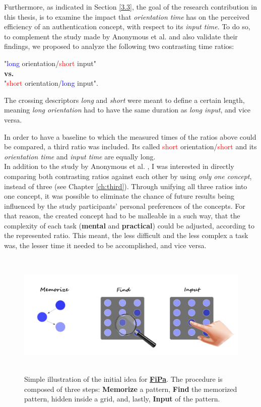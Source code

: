 Furthermore, as indicated in Section \ref{3.3}, the goal of the research contribution in this thesis, is to examine the impact that \textit{orientation time} has on the perceived efficiency of an authentication concept, with respect to its \textit{input time}. To do so, to complement the study made by Anonymous et al. and also validate their findings, we proposed to analyze the following two contrasting time ratios:  
\begin{center}
    "\textcolor{blue}{long} orientation/\textcolor{red}{short} input" \\
    \textbf{vs.} \\
    "\textcolor{red}{short} orientation/\textcolor{blue}{long} input".
\end{center} 

The crossing descriptors \textit{long} and \textit{short} were meant to define a certain length, meaning \textit{long orientation} had to have the same duration as \textit{long input}, and vice versa. 

In order to have a baseline to which the measured times of the ratios above could be compared, a third ratio was included. Its called \textcolor{red}{short} orientation/\textcolor{red}{short} and its \textit{orientation time} and \textit{input time} are equally long. \\
 

In addition to the study by Anonymous et al. \cite{anonymous}, I was interested in directly comparing both contrasting ratios against each other by using \textit{only one concept}, instead of three (see Chapter \ref{ch:third}). Through unifying all three ratios into one concept, it was possible to eliminate the chance of future results being influenced by the study participants' personal preferences of the concepts.
For that reason, the created concept had to be malleable in a such way, that the complexity of each task (\textbf{mental} and \textbf{practical}) could be adjusted, according to the represented ratio. This meant, the less difficult and the less complex a task was, the lesser time it needed to be accomplished, and vice versa. 

\begin{figure}[t!]
\centering
\includegraphics[width=15cm, height=6cm]{Chapters/graphics/ConceptIdea.jpeg}
\caption{Simple illustration of the initial idea for \underline{\textbf{FiPa}}. The procedure is composed of three steps: \textbf{Memorize} a pattern, \textbf{Find} the memorized pattern, hidden inside a grid, and, lastly, \textbf{Input} of the pattern.}
\label{fig:concept}
\end{figure}

